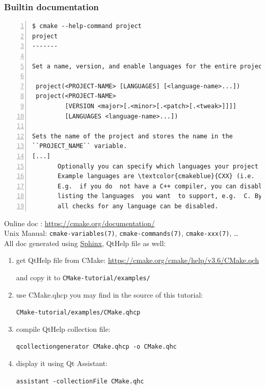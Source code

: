 \documentclass[compress,slidestop,table,usepdftitle=false
              ]
               {beamer}
\begin{document}
\begin{frame}
\frametitle{Builtin documentation}
\begin{Verbatim}[commandchars=\\\{\},fontsize=\tiny,numbers=left,frame=topline,label=CMake builtin doc for 'project' command]
  $ cmake --help-command project
project
-------

Set a name, version, and enable languages for the entire project.

 project(<PROJECT-NAME> [LANGUAGES] [<language-name>...])
 project(<PROJECT-NAME>
         [VERSION <major>[.<minor>[.<patch>[.<tweak>]]]]
         [LANGUAGES <language-name>...])

Sets the name of the project and stores the name in the
``PROJECT_NAME`` variable.
[...]
       Optionally you can specify which languages your project supports.
       Example languages are \textcolor{cmakeblue}{CXX} (i.e.  C++), \textcolor{cmakeblue}{C}, \textcolor{cmakeblue}{Fortran}, etc.  By \textcolor{cmakered}{default C} \textcolor{cmakered}{and CXX are enabled}.
       E.g.  if you do  not have a C++ compiler, you can disable the check  for it by  explicitly
       listing the languages  you want  to support, e.g.  C. By using the special language "\textcolor{cmakeblue}{NONE}"
       all checks for any language can be disabled.
\end{Verbatim}
Online doc : \url{https://cmake.org/documentation/}\\
Unix Manual: {\scriptsize \texttt{cmake-variables(7)}, \texttt{cmake-commands(7)}, \texttt{cmake-xxx(7)}, \ldots}\\
All doc generated using \href{http://www.sphinx-doc.org/en/stable/builders.html}{Sphinx},
QtHelp file as well:\\
\begin{small}
\begin{enumerate}
\item get QtHelp file from CMake: \url{https://cmake.org/cmake/help/v3.6/CMake.qch}

      and copy it to \texttt{CMake-tutorial/examples/}
\item use CMake.qhcp you may find in the source of this tutorial:

      \texttt{CMake-tutorial/examples/CMake.qhcp}
\item compile QtHelp collection file:

      \texttt{qcollectiongenerator CMake.qhcp -o CMake.qhc}
\item display it using Qt Assistant:

  \texttt{assistant -collectionFile CMake.qhc}
\end{enumerate}
\end{small}
\end{frame}
\end{document}
